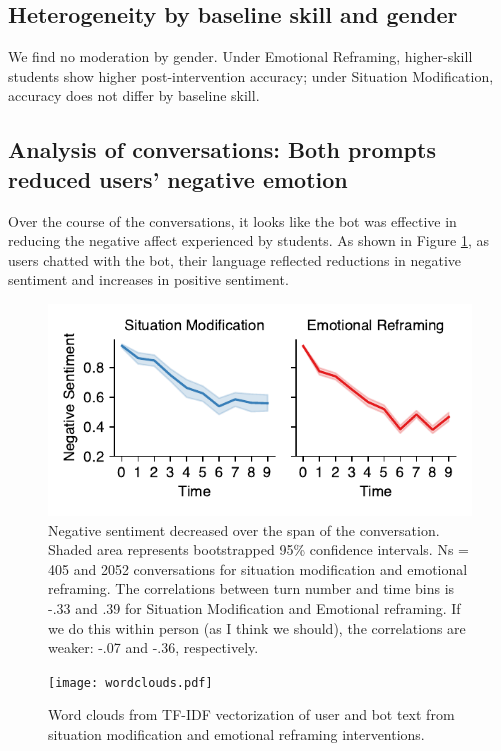 \documentclass[11pt]{report}
\begin{document}
\begin{mainf}
\subsection{Heterogeneity by baseline skill and gender}

We find no moderation by gender. 
Under Emotional Reframing, higher-skill students show higher post-intervention accuracy; under Situation Modification, accuracy does not differ by baseline skill.

\subsection{Analysis of conversations: Both prompts reduced users' negative emotion}

Over the course of the conversations, it looks like the bot was effective in reducing the negative affect experienced by students. 
As shown in Figure \ref{fig:sentiment}, as users chatted with the bot, their language reflected reductions in negative sentiment and increases in positive sentiment.


\begin{figure}
    \centering
    \includegraphics[width=\linewidth]{sentiment.pdf}
    \caption{Negative sentiment decreased over the span of the conversation. Shaded area represents bootstrapped 95\% confidence intervals. Ns = 405 and 2052 conversations for situation modification and emotional reframing. The correlations between turn number and time bins is -.33 and .39 for Situation Modification and Emotional reframing. If we do this within person (as I think we should), the correlations are weaker: -.07 and -.36, respectively.}
    \label{fig:sentiment}
\end{figure}

\begin{figure}
    \centering
    \texttt{[image: wordclouds.pdf]}
    \caption{Word clouds from TF-IDF vectorization of user and bot text from situation modification and emotional reframing interventions.}
    \label{fig:wordclouds}
\end{figure}




\end{mainf}
\end{document}
